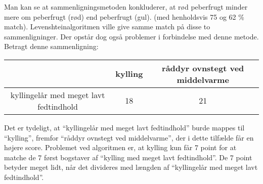 
Man kan se at sammenligningsmetoden konkluderer, at rød peberfrugt minder mere om peberfrugt (rød) end peberfrugt (gul). (med henholdsvis 75 og 62 \% match). Levenshteinalgoritmen ville give samme match på disse to sammenligninger. Der opstår dog også problemer i forbindelse med denne metode. Betragt \fx denne sammenligning:

\begin{table}[H]
\centering
\begin{tabular}{| c | c | c |}
\hline
 & kylling & råddyr ovnstegt ved middelvarme \\ \hline
kyllingelår med meget lavt fedtindhold & 18 & 21 \\ \hline
\end{tabular}
\end{table}

Det er tydeligt, at ``kyllingelår med meget lavt fedtindhold'' burde mappes til ``kylling'', fremfor ``råddyr ovnstegt ved middelvarme'', der i dette tilfælde får en højere score. Problemet ved algoritmen er, at kylling kun får 7 point for at matche de 7 først bogstaver af ``kylling med meget lavt fedtindhold''. De 7 point betyder meget lidt, når det divideres med længden af ``kyllingelår med meget lavt fedtindhold''.

